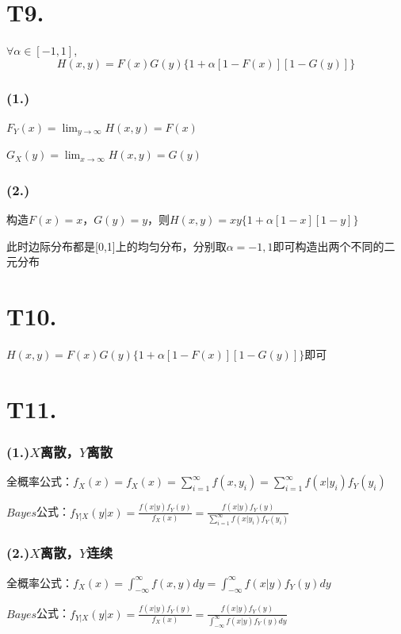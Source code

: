 \documentclass{article}
\newcommand\f[2]{\frac{#1}{#2}}
\begin{document}
\section*{T9. }

$\forall \alpha \in [-1,1]$,$$H(x,y)=F(x)G(y)\{1+\alpha[1-F(x)][1-G(y)]\}$$

\subsubsection*{(1.)}

$F_Y(x)=\lim_{y\to\infty}H(x,y)=F(x)$

$G_X(y)=\lim_{x\to\infty}H(x,y)=G(y)$

\subsubsection*{(2.)}

构造$F(x)=x$，$G(y)=y$，则$H(x,y)=xy\{1+\alpha[1-x][1-y]\}$

此时边际分布都是[0,1]上的均匀分布，分别取$\alpha=-1,1$即可构造出两个不同的二元分布

\section*{T10. }

$H(x,y)=F(x)G(y)\{1+\alpha[1-F(x)][1-G(y)]\}$即可

\section*{T11. }

\subsubsection*{(1.)$X$离散，$Y$离散}

全概率公式：$f_X(x)=f_X(x)=\sum_{i=1}^{\infty}f(x,y_i)=\sum_{i=1}^{\infty}f(x|y_i)f_Y(y_i)$

$Bayes$公式：$f_{Y|X}(y|x)=\f{f(x|y)f_Y(y)}{f_X(x)}=\f{f(x|y)f_Y(y)}{\sum_{i=1}^{\infty}f(x|y_i)f_Y(y_i)}$

\subsubsection*{(2.)$X$离散，$Y$连续}

全概率公式：$f_X(x)=\int_{-\infty}^{\infty}f(x,y)dy=\int_{-\infty}^{\infty}f(x|y)f_Y(y)dy$

$Bayes$公式：$f_{Y|X}(y|x)=\f{f(x|y)f_Y(y)}{f_X(x)}=\f{f(x|y)f_Y(y)}{\int_{-\infty}^{\infty}f(x|y)f_Y(y)dy}$
\end{document}
